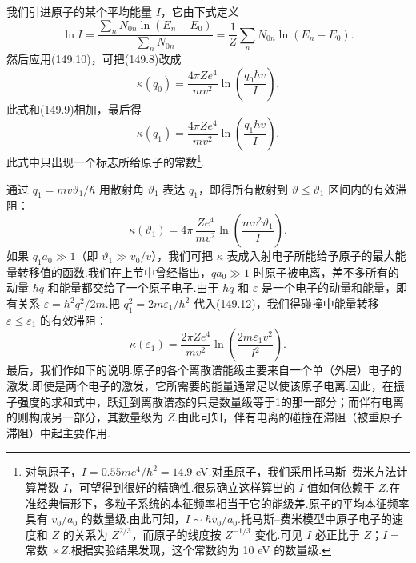 我们引进原子的某个平均能量 $I$，它由下式定义
\begin{equation}
  \ln I=\frac{\sum_nN_{0n}\ln(E_n-E_0)}{\sum_nN_{0n}}
  =\frac{1}{Z}\sum_nN_{0n}\ln(E_n-E_0).
\end{equation}
然后应用(149.10)，可把(149.8)改成
\begin{equation*}
  \kappa(q_0)=\frac{4\pi Ze^4}{mv^2}\ln\left(\frac{q_0\hbar v}{I}\right).
\end{equation*}
此式和(149.9)相加，最后得
\begin{equation}
  \kappa(q_1)=\frac{4\pi Ze^4}{mv^2}\ln\left(\frac{q_1\hbar v}{I}\right).
\end{equation}
此式中只出现一个标志所给原子的常数\footnote{对氢原子，$I=0.55me^4/\hbar^2=14.9$ eV.对重原子，我们采用托马斯–费米方法计算常数 $I$，可望得到很好的精确性.很易确立这样算出的 $I$ 值如何依赖于 $Z$.在准经典情形下，多粒子系统的本征频率相当于它的能级差.原子的平均本征频率具有 $v_0/a_0$ 的数量级.由此可知，$I\sim\hbar v_0/a_0$.托马斯–费米模型中原子电子的速度和 $Z$ 的关系为 $Z^{2/3}$，而原子的线度按 $Z^{-1/3}$ 变化.可见 $I$ 必正比于 $Z$；$I=$ 常数 $\times Z$.根据实验结果发现，这个常数约为 10 eV 的数量级.}.

通过 $q_1=mv\vartheta_1/\hbar$ 用散射角 $\vartheta_1$ 表达 $q_1$，即得所有散射到 $\vartheta\leqslant\vartheta_1$ 区间内的有效滞阻：
\begin{equation}
  \kappa(\vartheta_1)=4\pi\,\frac{Ze^4}{mv^2}\ln\left(\frac{mv^2\vartheta_1}{I}\right).
\end{equation}
如果 $q_1a_0\gg1$（即 $\vartheta_1\gg v_0/v$），我们可把 $\kappa$ 表成入射电子所能给予原子的最大能量转移值的函数.我们在上节中曾经指出，$qa_0\gg1$ 时原子被电离，差不多所有的动量 $\hbar q$ 和能量都交给了一个原子电子.由于 $\hbar q$ 和 $\varepsilon$ 是一个电子的动量和能量，即有关系 $\varepsilon=\hbar^2q^2/2m$.把 $q_1^2=2m\varepsilon_1/\hbar^2$ 代入(149.12)，我们得碰撞中能量转移 $\varepsilon\leqslant\varepsilon_1$ 的有效滞阻：
\begin{equation}
  \kappa(\varepsilon_1)=\frac{2\pi Ze^4}{mv^2}\ln\left(\frac{2m\varepsilon_1v^2}{I^2}\right).
\end{equation}
最后，我们作如下的说明.原子的各个离散谱能级主要来自一个单（外层）电子的激发.即使是两个电子的激发，它所需要的能量通常足以使该原子电离.因此，在振子强度的求和式中，跃迁到离散谱态的只是数量级等于1的那一部分；而伴有电离的则构成另一部分，其数量级为 $Z$.由此可知，伴有电离的碰撞在滞阻（被重原子滞阻）中起主要作用.


